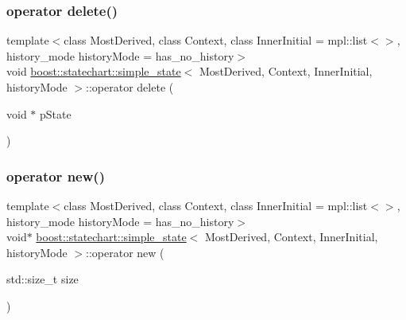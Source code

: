 \subsubsection{\texorpdfstring{operator delete()}{operator delete()}}
{\footnotesize\ttfamily template$<$class Most\+Derived, class Context, class Inner\+Initial = mpl\+::list$<$$>$, history\+\_\+mode history\+Mode = has\+\_\+no\+\_\+history$>$ \\
void \mbox{\hyperlink{classboost_1_1statechart_1_1simple__state}{boost\+::statechart\+::simple\+\_\+state}}$<$ Most\+Derived, Context, Inner\+Initial, history\+Mode $>$\+::operator delete (\begin{DoxyParamCaption}\item[{void $\ast$}]{p\+State }\end{DoxyParamCaption})\hspace{0.3cm}{\ttfamily [inline]}}

\mbox{\label{classboost_1_1statechart_1_1simple__state_a4fbec8248bbcd17578b6746a684e3c9e}} 
\subsubsection{\texorpdfstring{operator new()}{operator new()}}
{\footnotesize\ttfamily template$<$class Most\+Derived, class Context, class Inner\+Initial = mpl\+::list$<$$>$, history\+\_\+mode history\+Mode = has\+\_\+no\+\_\+history$>$ \\
void$\ast$ \mbox{\hyperlink{classboost_1_1statechart_1_1simple__state}{boost\+::statechart\+::simple\+\_\+state}}$<$ Most\+Derived, Context, Inner\+Initial, history\+Mode $>$\+::operator new (\begin{DoxyParamCaption}\item[{std\+::size\+\_\+t}]{size }\end{DoxyParamCaption})\hspace{0.3cm}{\ttfamily [inline]}}

\mbox{\label{classboost_1_1statechart_1_1simple__state_a538172d521f6d6d75e513cd79af79334}} 
